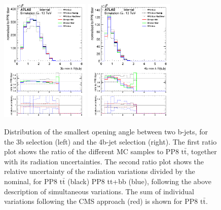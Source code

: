 \begin{figure}[!htb]
\centering
\includegraphics[width=0.38\textwidth]{Plots/ttbb/hisgenEvt_Dr_MinDeltaRGenBJets_4j3t__div}
\includegraphics[width=0.38\textwidth]{Plots/ttbb/hisgenEvt_Dr_MinDeltaRGenBJets_4j4t__div}
  \caption{Distribution of the smallest opening angle between two b-jets, for the 3b selection (left) and the 4b-jet selection (right). The first ratio plot shows the ratio of the different MC samples to PP8 $\mathrm{t\bar{t}}$, together with its radiation uncertainties. The second ratio plot shows the relative uncertainty of the radiation variations divided by the nominal, for PP8 $\mathrm{t\bar{t}}$ (black) PP8 tt+bb (blue), following the above description of simultaneous variations. The sum of individual variations following the CMS approach (red) is shown for PP8 $\mathrm{t\bar{t}}$. \label{ttbb:mindR}}
\end{figure}

